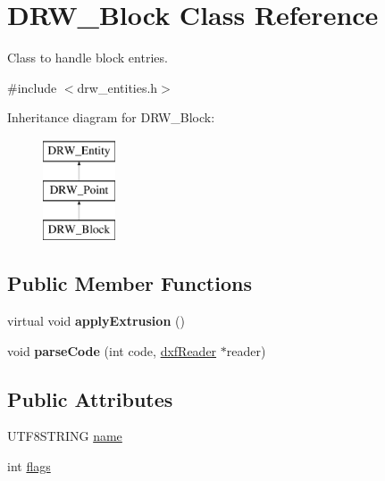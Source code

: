 \hypertarget{classDRW__Block}{\section{D\-R\-W\-\_\-\-Block Class Reference}
\label{classDRW__Block}
}


Class to handle block entries.  




{\ttfamily \#include $<$drw\-\_\-entities.\-h$>$}

Inheritance diagram for D\-R\-W\-\_\-\-Block\-:\begin{figure}[H]
\begin{center}
\leavevmode
\includegraphics[height=3.000000cm]{classDRW__Block}
\end{center}
\end{figure}
\subsection*{Public Member Functions}
\begin{DoxyCompactItemize}
\item 
\hypertarget{classDRW__Block_a39ff8d019e6bc71543aff4006870cafd}{virtual void {\bfseries apply\-Extrusion} ()}\label{classDRW__Block_a39ff8d019e6bc71543aff4006870cafd}

\item 
\hypertarget{classDRW__Block_a8db325e5201f85606c22fdbe84a623cb}{void {\bfseries parse\-Code} (int code, \hyperlink{classdxfReader}{dxf\-Reader} $\ast$reader)}\label{classDRW__Block_a8db325e5201f85606c22fdbe84a623cb}

\end{DoxyCompactItemize}
\subsection*{Public Attributes}
\begin{DoxyCompactItemize}
\item 
U\-T\-F8\-S\-T\-R\-I\-N\-G \hyperlink{classDRW__Block_a574a37d634655f8ea5526a80e842a66a}{name}
\item 
int \hyperlink{classDRW__Block_a17bb4c01376f4b30b8d3ce36863b3ae3}{flags}
\end{DoxyCompactItemize}

